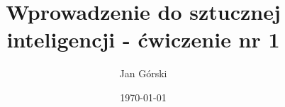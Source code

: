 \documentclass{article}
\title{Wprowadzenie do sztucznej inteligencji - ćwiczenie nr 1}
\author{Jan Górski}
\date{\today}
\begin{document}
  \maketitle

  \begin{sloppypar}

    \newpage

    \tableofcontents

    \newpage
    

    
    
    

    

    
	\newpage

  \end{sloppypar}
\end{document}
